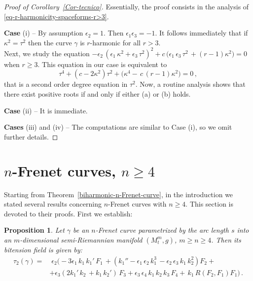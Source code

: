 \documentclass[11pt]{amsart}
\theoremstyle{plain}
\newtheorem{proposition}  [theorem]  {Proposition}
\theoremstyle{definition}
\numberwithin{equation}{section}
\begin{document}
\begin{proof}[Proof of Corollary~\ref{Cor-tecnico}]
Essentially, the proof consists in the analysis of \eqref{eq-r-harmonicity-spaceforms-r>3}.

\textbf{Case} (i) -- By assumption $\epsilon_2=1$. Then $\epsilon_1 \epsilon_3= -1$. It follows immediately that if $\kappa^2 = \tau^2$ then the curve $\gamma$ is $r$-harmonic for all $r > 3$.\\
Next, we study the equation $- \epsilon_2 \, (\epsilon_1 \, \kappa^2 + \epsilon_3 \, \tau^2)^2 + c \, \big( \epsilon_1\,\epsilon_3 \, \tau^2\, + (r - 1) \kappa^2\big) = 0$ when $r \geq 3$.
This equation in our case is equivalent to
$$\tau^4  + (  c - 2 \kappa^2 ) \tau^2  +\big ( \kappa^4 -  \, c\,(r - 1) \kappa^2\big ) = 0\,,$$
that is a second order degree equation in $\tau^2$. Now, a routine analysis shows that there exist positive roots if and only if either (a) or (b) holds.

\textbf{Case} (ii) -- It is immediate.

\textbf{Cases} (iii) and (iv) -- The computations are similar to Case (i), so we omit further details.
\end{proof}


\section{$n$-Frenet curves, $n \geq 4$}\label{Sec-n-Frenet}
Starting from Theorem~\ref{biharmonic-n-Frenet-curve}, in the introduction we stated several results concerning $n$-Frenet curves with $n \geq 4$. This section is devoted to their proofs. First we establish:

\begin{proposition}\label{prop-n-Frenet-bi}
Let $\gamma$ be an $n$-Frenet curve parametrized by the arc length $s$ into an $m$-dimensional semi-Riemannian manifold $(M_t^m, g)$, $m \geq n\geq 4$. Then its bitension field is given by:
\begin{equation}\label{eq-tau2-n-general}
\begin{aligned}
\tau_2(\gamma)  = &\; \epsilon_2 \big( - 3 \epsilon_1 \,  k_1 \, k_1' \,  F_1 \, +(k_1'' - \epsilon_1 \, \epsilon_2 \, k_1^3 \, - \epsilon_2 \, \epsilon_3 \, k_1 \, k_2^2) F_2 +\\
&+ \epsilon_3( 2  k_1'  \, k_2 \, + k_1 \,  k_2') \, F_3 + \epsilon_3 \, \epsilon_4  \,k_1 \, k_2 \, k_3 \, F_4 +  \, k_1 \, R(F_2, F_1) F_1  \big)\,.
\end{aligned}
\end{equation}
\end{proposition}
\end{document}

